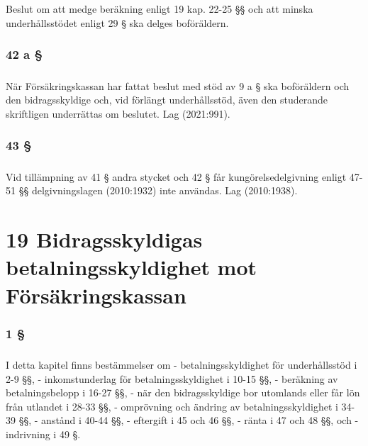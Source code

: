 \documentclass[a4paper,notitlepage,openany,10pt]{book}
\begin{document}
\paragraph*{}
Beslut om att medge beräkning enligt 19 kap. 22-25 §§ och att minska underhållsstödet enligt 29 § ska delges boföräldern.
\subsection*{42 a §}
\paragraph*{}
När Försäkringskassan har fattat beslut med stöd av 9 a § ska boföräldern och den bidragsskyldige och, vid förlängt underhållsstöd, även den studerande skriftligen underrättas om beslutet.
Lag (2021:991).
\subsection*{43 §}
\paragraph*{}
Vid tillämpning av 41 § andra stycket och 42 § får kungörelsedelgivning enligt 47-51 §§ delgivningslagen (2010:1932) inte användas.
Lag (2010:1938).
\chapter*{19 Bidragsskyldigas betalningsskyldighet mot Försäkringskassan}
\subsection*{1 §}
\paragraph*{}
I detta kapitel finns bestämmelser om
\newline - betalningsskyldighet för underhållsstöd i 2-9 §§,
\newline - inkomstunderlag för betalningsskyldighet i 10-15 §§, - beräkning av betalningsbelopp i 16-27 §§,
\newline - när den bidragsskyldige bor utomlands eller får lön från utlandet i 28-33 §§,
\newline - omprövning och ändring av betalningsskyldighet i 34-39 §§, - anstånd i 40-44 §§,
\newline - eftergift i 45 och 46 §§,
\newline - ränta i 47 och 48 §§, och
\newline - indrivning i 49 §.
\end{document}
